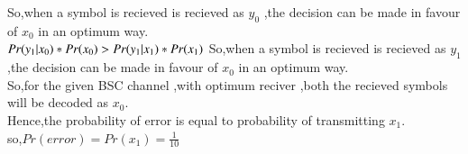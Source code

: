 \documentclass[journel,12pt,twocoloums]{IEEEtran}
\begin{document}
So,when a symbol is recieved is recieved as $y_0$ ,the decision can be made in favour of $x_0$ in an optimum way.\\
\begin{math}
Pr(y_1|x_0)*Pr(x_0)>Pr(y_1|x_1)*Pr(x_1)\\
\end{math}
So,when a symbol is recieved is recieved as $y_1$ ,the decision can be made in favour of $x_0$ in an optimum way.\\
So,for the given BSC channel ,with optimum reciver ,both the recieved symbols will be decoded as $x_0$.\\
Hence,the probability of error is equal to probability of transmitting $x_1$.\\
so,$Pr(error)=Pr(x_1)=\frac{1}{10}$
\end{document}
